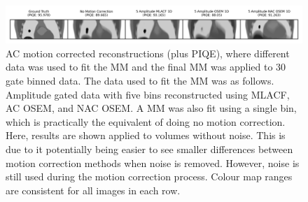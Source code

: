             \begin{figure}
                \centering
                
                \includegraphics[width=1.0\linewidth]{figures/motion_correction_2_results_2_noiseless_5_amplitude_visual_analysis.png}
                
                \captionsetup{singlelinecheck=false}
                \caption{
                    \gls{AC} motion corrected reconstructions (plus \gls{PIQE}), where different data was used to fit the \gls{MM} and the final \gls{MM} was applied to $30$ gate binned data. The data used to fit the \gls{MM} was as follows. Amplitude gated data with five bins reconstructed using \gls{MLACF}, \gls{AC} \gls{OSEM}, and \gls{NAC} \gls{OSEM}. A \gls{MM} was also fit using a single bin, which is practically the equivalent of doing no motion correction. Here, results are shown applied to volumes without noise. This is due to it potentially being easier to see smaller differences between motion correction methods when noise is removed. However, noise is still used during the motion correction process. Colour map ranges are consistent for all images in each row.
                }
                
                \label{fig:evaluation_of_pet_ct_motion_correction_incorporating_motion_models_using_mlacf_and_complex_gating_schemes_results_noiseless_5_amplitude_visual_analysis}
            \end{figure}

